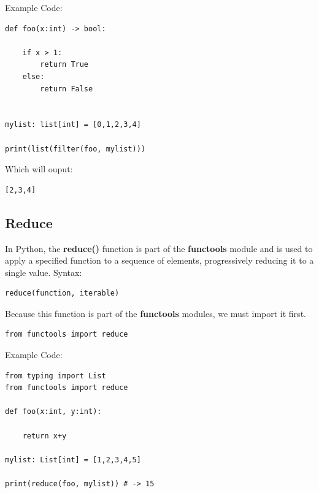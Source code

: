\documentclass{report}
\begin{document}
    \bigbreak \noindent 
    Example Code:
    \begin{verbatim}
def foo(x:int) -> bool:

    if x > 1:
        return True
    else:
        return False


mylist: list[int] = [0,1,2,3,4]

print(list(filter(foo, mylist)))
    \end{verbatim}
    Which will ouput:
    \begin{verbatim}
[2,3,4]
    \end{verbatim}


    \subsection{Reduce}
    \bigbreak \noindent
    In Python, the \textbf{reduce()} function is part of the \textbf{functools} module and is used to apply a specified function to a sequence of elements, progressively reducing it to a single value. 
    \bigbreak \noindent 
    Syntax:
    \begin{verbatim}
reduce(function, iterable)
    \end{verbatim}
    Because this function is part of the \textbf{functools} modules, we must import it first.
    \begin{verbatim}
from functools import reduce
    \end{verbatim}
    Example Code:
    \begin{verbatim}
from typing import List
from functools import reduce

def foo(x:int, y:int):

    return x+y

mylist: List[int] = [1,2,3,4,5] 

print(reduce(foo, mylist)) # -> 15
    \end{verbatim}
\end{document}
